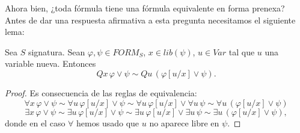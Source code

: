 Ahora bien, ¿toda fórmula tiene una fórmula equivalente en forma prenexa? Antes de dar una respuesta afirmativa a esta pregunta necesitamos el siguiente lema:
\begin{lema}\label{lemita2345}
Sea $S$ signatura. Sean $\varphi,\psi \in FORM_S$, $x \in lib(\psi)$, $u \in Var$ tal que $u$ una variable nueva. Entonces 
$$Q x \, \varphi \lor \psi \sim Q u \, (\varphi[u/x] \lor \psi).$$
\begin{proof}
Es consecuencia de las reglas de equivalencia:
$$\forall x \, \varphi \lor \psi \sim \forall u \, \varphi[u/x] \lor \psi \sim \forall u \, \varphi[u/x] \lor \forall u\, \psi \sim \forall u \, (\varphi[u/x] \lor \psi)$$
$$\exists x \, \varphi \lor \psi \sim \exists u \, \varphi[u/x] \lor \psi \sim \exists u \, \varphi[u/x] \lor \exists u\, \psi \sim \exists u \, (\varphi[u/x] \lor \psi),$$
donde en el caso $\forall$ hemos usado que $u$ no aparece libre en $\psi$.
\end{proof}
\end{lema}

